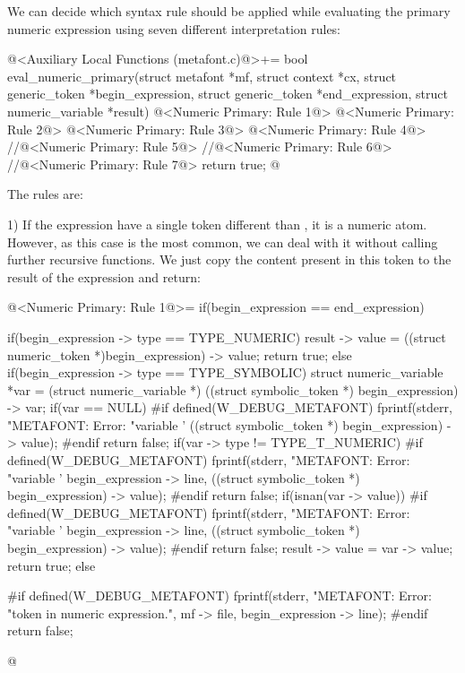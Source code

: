 We can decide which syntax rule should be applied while evaluating the
primary numeric expression using seven different interpretation rules:

\iniciocodigo
@<Auxiliary Local Functions (metafont.c)@>+=
bool eval_numeric_primary(struct metafont *mf, struct context *cx,
                          struct generic_token *begin_expression,
                          struct generic_token *end_expression,
                          struct numeric_variable *result){
  @<Numeric Primary: Rule 1@>
  @<Numeric Primary: Rule 2@>
  @<Numeric Primary: Rule 3@>
  @<Numeric Primary: Rule 4@>
  //@<Numeric Primary: Rule 5@>
  //@<Numeric Primary: Rule 6@>
  //@<Numeric Primary: Rule 7@>
  return true;
}
@

The rules are:

1) If the expression have a single token different
than , it is a numeric atom. However, as
this case is the most common, we can deal with it without calling
further recursive functions. We just copy the content present in this
token to the result of the expression and return:

\iniciocodigo
@<Numeric Primary: Rule 1@>=
if(begin_expression == end_expression){
  if(begin_expression -> type == TYPE_NUMERIC){
    result -> value = ((struct numeric_token *)begin_expression) -> value;
    return true;
  }
  else if(begin_expression -> type == TYPE_SYMBOLIC){
    struct numeric_variable *var = (struct numeric_variable *)
                                     ((struct symbolic_token *)
                                      begin_expression) -> var;
    if(var == NULL){
#if defined(W_DEBUG_METAFONT)
      fprintf(stderr, "METAFONT: Error: %
              "variable '%
              ((struct symbolic_token *) begin_expression) -> value);
#endif
      return false;
    }
    if(var -> type != TYPE_T_NUMERIC){
#if defined(W_DEBUG_METAFONT)
      fprintf(stderr, "METAFONT: Error: %
              "variable '%
              begin_expression -> line,
              ((struct symbolic_token *) begin_expression) -> value);
#endif
      return false;
    }
    if(isnan(var -> value)){
#if defined(W_DEBUG_METAFONT)
      fprintf(stderr, "METAFONT: Error: %
              "variable '%
              begin_expression -> line,
              ((struct symbolic_token *) begin_expression) -> value);
#endif
      return false;
    }
    result -> value = var -> value;
    return true;
  }
  else{
#if defined(W_DEBUG_METAFONT)
    fprintf(stderr, "METAFONT: Error: %
            "token in numeric expression.\n", mf -> file,
            begin_expression -> line);
#endif
      return false;

  }
}
@
\fimcodigo


